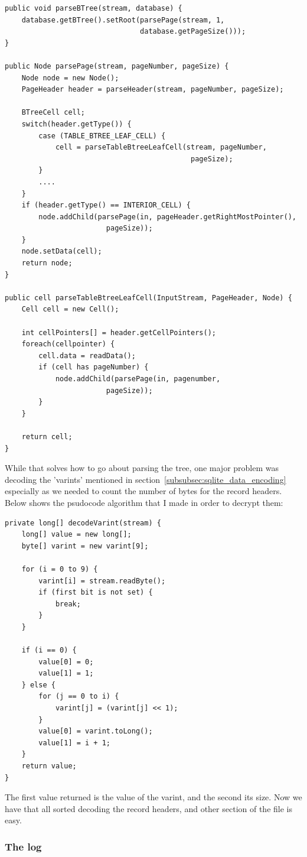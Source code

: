 \begin{lstlisting}	
public void parseBTree(stream, database) {
	database.getBTree().setRoot(parsePage(stream, 1, 
								database.getPageSize()));
}

public Node parsePage(stream, pageNumber, pageSize) {
	Node node = new Node();
	PageHeader header = parseHeader(stream, pageNumber, pageSize);
	
	BTreeCell cell;
	switch(header.getType()) {
		case (TABLE_BTREE_LEAF_CELL) {
			cell = parseTableBtreeLeafCell(stream, pageNumber, 
											pageSize);
		}
		....
	}
	if (header.getType() == INTERIOR_CELL) {
		node.addChild(parsePage(in, pageHeader.getRightMostPointer(), 
						pageSize));
	}
	node.setData(cell);
	return node;
}

public cell parseTableBtreeLeafCell(InputStream, PageHeader, Node) {
	Cell cell = new Cell();
	
	int cellPointers[] = header.getCellPointers();
	foreach(cellpointer) {
		cell.data = readData();		
		if (cell has pageNumber) {
			node.addChild(parsePage(in, pagenumber, 
						pageSize));
		}
	}
	
	return cell;
}
\end{lstlisting}

While that solves how to go about parsing the tree, one major problem was decoding the 'varints' mentioned in section~\ref{subsubsec:sqlite_data_encoding} especially as we needed to count the number of bytes for the record headers. Below shows the psudocode algorithm that I made in order to decrypt them: 

\begin{lstlisting}	
private long[] decodeVarint(stream) {
	long[] value = new long[];
	byte[] varint = new varint[9];
	
	for (i = 0 to 9) {
		varint[i] = stream.readByte();
		if (first bit is not set) {
			break;
		}
	}
	
	if (i == 0) {
		value[0] = 0;
		value[1] = 1;
	} else {
		for (j == 0 to i) {
			varint[j] = (varint[j] << 1);
		}
		value[0] = varint.toLong();
		value[1] = i + 1;
	}
	return value;
}
\end{lstlisting}

The first value returned is the value of the varint, and the second its size. Now we have that all sorted decoding the record headers, and other section of the file is easy.

\subsubsection{The log}
\label{subsubsec:log_imp}

